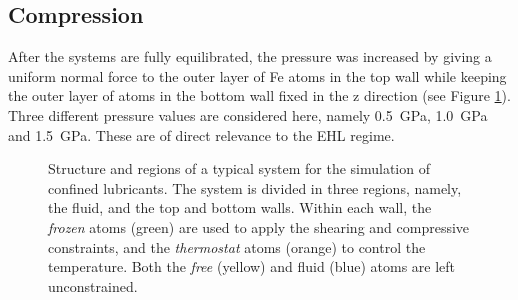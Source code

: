 \documentclass[aps,prb,reprint,superscriptaddress, a4paper]{revtex4-1}
\begin{document}
\subsection{Compression}

After the systems are fully equilibrated, the pressure was increased by giving a uniform normal force to the outer layer of Fe atoms in the top wall while keeping the outer layer of atoms in the bottom wall fixed in the z direction (see Figure \ref{fig:Regions}). Three different pressure values are considered here, namely \SI{0.5}{\giga\pascal}, \SI{1.0}{\giga\pascal} and \SI{1.5}{\giga\pascal}. These are of direct relevance to the EHL regime\cite{Spikes2014}.

\begin{figure}
    	\begin{center}
		\caption{Structure and regions of a typical system for the simulation of confined lubricants. The system is divided in three regions, namely, the fluid, and the top and bottom walls. Within each wall, the \textit{frozen} atoms (green) are used to apply the shearing and compressive constraints, and  the \textit{thermostat} atoms (orange) to control the temperature. Both the \textit{free} (yellow) and fluid (blue) atoms are left unconstrained.}
		\label{fig:Regions}
	\end{center}
\end{figure}
\end{document}
